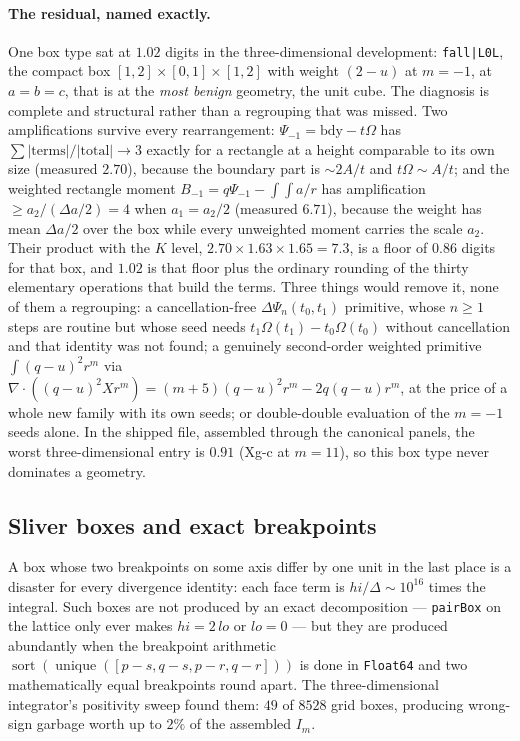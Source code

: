 \documentclass[11pt]{article}
\theoremstyle{remark}
\newcommand{\code}[1]{\texttt{#1}}
\begin{document}
\paragraph{The residual, named exactly.} One box type sat at $1.02$ digits in the
three-dimensional development: \code{fall|L0L}, the compact box $[1,2]\times[0,1]\times[1,2]$
with weight $(2-u)$ at $m = -1$, at $a = b = c$, that is at the \emph{most benign}
geometry, the unit cube. The diagnosis is complete and structural rather than a regrouping
that was missed. Two amplifications survive every rearrangement: $\Psi_{-1} = \mathrm{bdy} - t\Omega$
has $\sum|\mathrm{terms}|/|\mathrm{total}| \to 3$ exactly for a rectangle at a height
comparable to its own size (measured $2.70$), because the boundary part is $\sim 2A/t$ and
$t\Omega \sim A/t$; and the weighted rectangle moment
$B_{-1} = q\Psi_{-1} - \int\!\int a/r$ has amplification $\ge a_2/(\Delta a/2) = 4$ when
$a_1 = a_2/2$ (measured $6.71$), because the weight has mean $\Delta a/2$ over the box while
every unweighted moment carries the scale $a_2$. Their product with the $K$ level,
$2.70\times1.63\times1.65 = 7.3$, is a floor of $0.86$ digits for that box, and $1.02$ is
that floor plus the ordinary rounding of the thirty elementary operations that build the
terms. Three things would remove it, none of them a regrouping: a cancellation-free
$\Delta\Psi_n(t_0,t_1)$ primitive, whose $n\ge1$ steps are routine but whose seed needs
$t_1\Omega(t_1) - t_0\Omega(t_0)$ without cancellation and that identity was not found; a
genuinely second-order weighted primitive $\int(q-u)^2r^m$ via
$\nabla\cdot((q-u)^2Xr^m) = (m+5)(q-u)^2r^m - 2q(q-u)r^m$, at the price of a whole new
family with its own seeds; or double-double evaluation of the $m = -1$ seeds alone. In the
shipped file, assembled through the canonical panels, the worst three-dimensional entry is
$0.91$ (Xg-c at $m = 11$), so this box type never dominates a geometry.

\subsection{Sliver boxes and exact breakpoints}
\label{sec:sliver}

A box whose two breakpoints on some axis differ by one unit in the last place is a disaster
for every divergence identity: each face term is $hi/\Delta \sim 10^{16}$ times the
integral. Such boxes are not produced by an exact decomposition --- \code{pairBox} on the
lattice only ever makes $hi = 2\,lo$ or $lo = 0$ --- but they are produced abundantly when
the breakpoint arithmetic
$\operatorname{sort}(\operatorname{unique}([p-s, q-s, p-r, q-r]))$ is done in
\code{Float64} and two mathematically equal breakpoints round apart. The three-dimensional
integrator's positivity sweep found them: $49$ of $8528$ grid boxes, producing wrong-sign
garbage worth up to $2\%$ of the assembled $I_m$.
\end{document}
